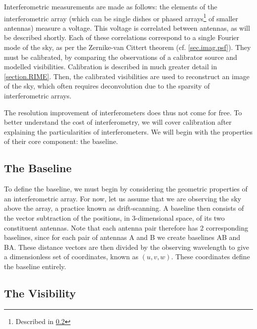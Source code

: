 \pg
Interferometric measurements are made as follows: the elements of the interferometric array (which can be single dishes or phased arrays\footnote{Described in \cref{sec.visibility}} of smaller antennas) measure a voltage. This voltage is correlated between antennas, as will be described shortly. Each of these correlations correspond to a single Fourier mode of the sky, as per the Zernike-van Cittert theorem (cf. \cref{sec.imag.psf}). They must be calibrated, by comparing the observations of a calibrator source and modelled visibilities. Calibration is described in much greater detail in \cref{section.RIME}. Then, the calibrated visibilities are used to reconstruct an image of the sky, which often requires deconvolution due to the sparsity of interferometric arrays.

\pg
The resolution improvement of interferometers does thus not come for free. To better understand the cost of interferometry, we will cover calibration after explaining the particularities of interferometers. We will begin with the properties of their core component: the baseline.

\subsection{The Baseline}

\pg
To define the baseline, we must begin by considering the geometric properties of an interferometric array. For now, let us assume that we are observing the sky above the array, a practice known as drift-scanning. A baseline then consists of the vector subtraction of the positions, in 3-dimensional space, of its two constituent antennas. Note that each antenna pair therefore has 2 corresponding baselines, since for each pair of antennas A and B we create baselines AB and BA. These distance vectors are then divided by the observing wavelength to give a dimensionless set of coordinates, known as $(u,v,w)$. These coordinates define the baseline entirely. 

\subsection{The Visibility}\label{sec.visibility}

